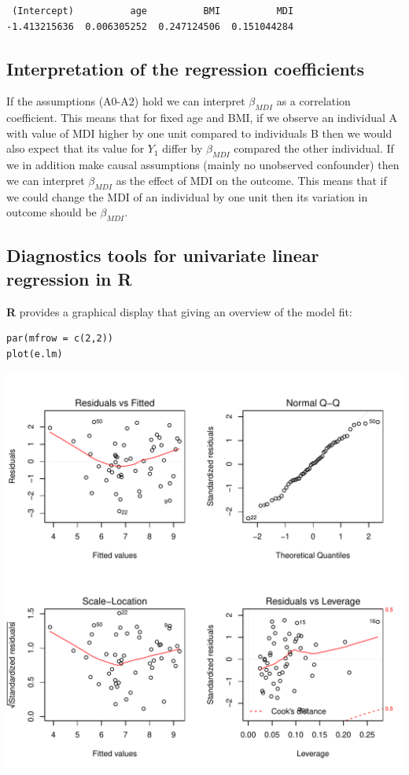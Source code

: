 \documentclass{article}
\newcommand\Rlogo{\textbf{\textsf{R}}}
\begin{document}
\begin{verbatim}
 (Intercept)          age          BMI          MDI 
-1.413215636  0.006305252  0.247124506  0.151044284
\end{verbatim}

\subsection{Interpretation of the regression coefficients}
\label{sec:interpretationLM}
If the assumptions (A0-A2) hold we can interpret \(\beta_{MDI}\) as a
correlation coefficient. This means that for fixed age and BMI, if we
observe an individual A with value of MDI higher by one unit compared
to individuals B then we would also expect that its value for \(Y_1\)
differ by \(\beta_{MDI}\) compared the other individual. If we in
addition make causal assumptions (mainly no unobserved confounder)
then we can interpret \(\beta_{MDI}\) as the effect of MDI on the
outcome. This means that if we could change the MDI of an individual
by one unit then its variation in outcome should be \(\beta_{MDI}\).

\subsection{Diagnostics tools for univariate linear regression in \Rlogo{}}
\label{sec:diagLM}
\Rlogo{} provides a graphical display that giving an overview of the
model fit:
\lstset{language=r,label= ,caption= ,captionpos=b,numbers=none}
\begin{lstlisting}
par(mfrow = c(2,2))
plot(e.lm)
\end{lstlisting}

\begin{center}
\includegraphics[width=.9\linewidth]{./figures/diag-lm.pdf}
\end{center}
\end{document}
